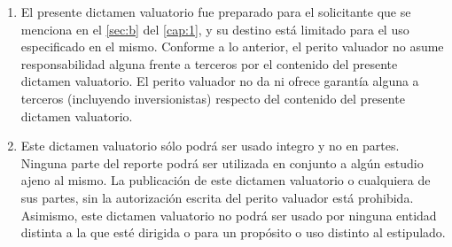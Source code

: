 \begin{enumerate}[\indent a)]
\item El presente dictamen valuatorio fue preparado para el solicitante que se menciona en el \autoref{sec:b} del \autoref{cap:1}, y su destino está limitado para el uso especificado  en el mismo. Conforme a lo anterior, el perito valuador no asume responsabilidad alguna frente a terceros por el contenido del presente dictamen valuatorio. El perito valuador no da ni ofrece garantía alguna a terceros (incluyendo inversionistas) respecto del contenido del presente dictamen valuatorio.

\item Este dictamen valuatorio sólo podrá ser usado integro y no en partes. Ninguna parte del reporte podrá ser utilizada en conjunto a algún estudio ajeno al mismo. La publicación de este dictamen valuatorio o cualquiera de sus partes, sin la autorización escrita del perito valuador está prohibida. Asimismo, este dictamen valuatorio no podrá ser usado por ninguna entidad distinta a la que esté dirigida o para un propósito o uso distinto al estipulado.

\end{enumerate}